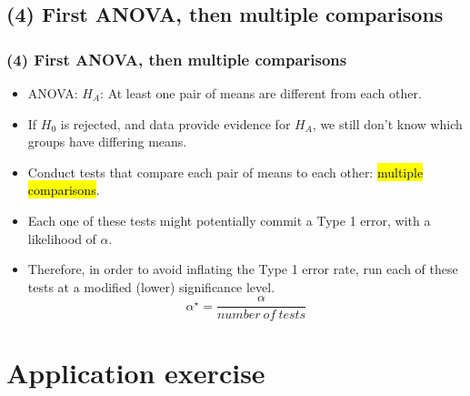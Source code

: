\documentclass[slidestop,compress,mathserif]{beamer}
\begin{document}

\subsection{(4) First ANOVA, then multiple comparisons}


\begin{frame}
\frametitle{(4) First ANOVA, then multiple comparisons}

\begin{itemize}

\item ANOVA: $H_A$:  At least one pair of means are different from each other.

\pause

\item If $H_0$ is rejected, and data provide evidence for $H_A$, we still don't know which groups have differing means.

\pause

\item Conduct tests that compare each pair of means to each other: \hl{multiple comparisons}.

\pause

\item Each one of these tests might potentially commit a Type 1 error, with a likelihood of $\alpha$.

\pause

\item Therefore, in order to avoid inflating the Type 1 error rate, run each of these tests at a modified (lower) significance level. 
\[ \alpha^\star = \frac{\alpha}{number~of~tests} \]

\end{itemize}

\end{frame}


\begin{frame}
\frametitle{}


\end{frame}


\section{Application exercise}
\end{document}
